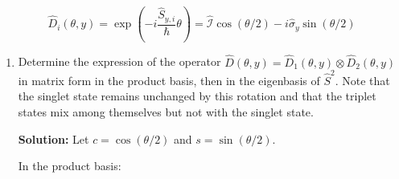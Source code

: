 \documentclass{article}
\begin{document}
\begin{enumerate}
        \[
        \hat{D}_{i}(\theta, y) = \exp \left(-i \frac{\hat{S}_{y, i}}{\hbar} \theta\right) = \hat{\mathcal{I}} \cos (\theta / 2) - i \hat{\sigma}_{y} \sin (\theta / 2)
        \]

        \begin{enumerate}
            \item Determine the expression of the operator \(\hat{D}(\theta, y) = \hat{D}_{1}(\theta, y) \otimes \hat{D}_{2}(\theta, y)\) in matrix form in the product basis, then in the eigenbasis of \(\hat{S}^{2}\). Note that the singlet state remains unchanged by this rotation and that the triplet states mix among themselves but not with the singlet state.

            {\color{red}\textbf{Solution:} Let \(c = \cos (\theta / 2)\) and \(s = \sin (\theta / 2)\).

            In the product basis:

}
\end{enumerate}
\end{enumerate}
\end{document}
